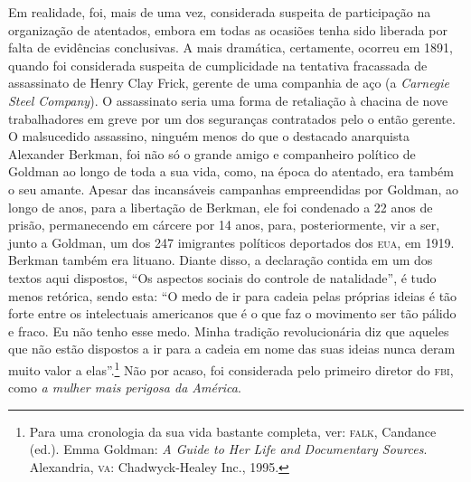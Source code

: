 Em realidade, foi, mais de uma
vez, considerada suspeita de participação na organização de atentados,
embora em todas as ocasiões tenha sido liberada por falta de evidências
conclusivas. A mais dramática, certamente, ocorreu em 1891, quando foi
considerada suspeita de cumplicidade na tentativa fracassada de
assassinato de Henry Clay Frick, gerente de uma companhia de aço (a
\textit{Carnegie Steel Company}). O assassinato seria uma forma de
retaliação à chacina de nove trabalhadores em greve por um dos
seguranças contratados pelo o então gerente. O malsucedido assassino,
ninguém menos do que o destacado anarquista Alexander Berkman, foi não
só o grande amigo e companheiro político de Goldman ao longo de toda a
sua vida, como, na época do atentado, era também o seu amante. Apesar
das incansáveis campanhas empreendidas por Goldman, ao longo de anos,
para a libertação de Berkman, ele foi condenado a 22 anos de
prisão, permanecendo em cárcere por 14 anos, para, posteriormente,
vir a ser, junto a Goldman, um dos 247 imigrantes políticos deportados
dos \textsc{eua}, em 1919. Berkman também era lituano. Diante disso, a declaração
contida em um dos textos aqui dispostos, ``Os aspectos sociais do
controle de natalidade'', é tudo menos retórica, sendo esta: ``O medo de
ir para cadeia pelas próprias ideias é tão forte entre os intelectuais
americanos que é o que faz o movimento ser tão pálido e fraco. Eu não
tenho esse medo. Minha tradição revolucionária diz que aqueles que não
estão dispostos a ir para a cadeia em nome das suas ideias nunca deram
muito valor a elas''.\footnote{Para uma cronologia da sua vida bastante
  completa, ver: \textsc{falk}, Candance (ed.). Emma Goldman: \textit{A Guide to
  Her Life and Documentary Sources}. Alexandria, \textsc{va}: Chadwyck-Healey
  Inc., 1995.} Não por acaso, foi considerada pelo primeiro diretor do
\textsc{fbi}, como \textit{a mulher mais perigosa da América}.

